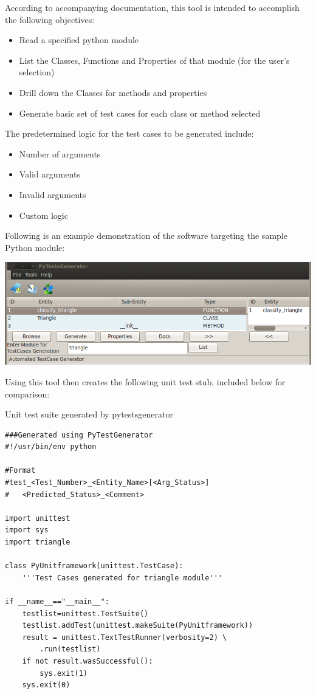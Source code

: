 \documentclass{icldt}
\numberwithin{equation}{section}       %
\begin{document}
{According to accompanying documentation, this tool is intended to accomplish the following objectives:
\begin{itemize}
	\item Read a specified python module
	\item List the Classes, Functions and Properties of that module (for the user's selection)
	\item Drill down the Classes for methods and properties
	\item Generate basic set of test cases for each class or method selected
\end{itemize}

The predetermined logic for the test cases to be generated include:
\begin{itemize}
	\item Number of arguments
	\item Valid arguments
	\item Invalid arguments
	\item Custom logic
\end{itemize}

Following is an example demonstration of the software targeting the sample Python module:

\includegraphics[scale=.51]{img/pytestsgenerator.png}

Using this tool then creates the following unit test stub, included below for comparison:
\begin{listing}[H]
	\caption{Unit test suite generated by \textsf{pytestsgenerator}}
	\begin{verbatim}
###Generated using PyTestGenerator
#!/usr/bin/env python

#Format
#test_<Test_Number>_<Entity_Name>[<Arg_Status>]
#	<Predicted_Status>_<Comment>

import unittest
import sys
import triangle

class PyUnitframework(unittest.TestCase):
	'''Test Cases generated for triangle module'''

if __name__=="__main__":
	testlist=unittest.TestSuite()
	testlist.addTest(unittest.makeSuite(PyUnitframework))
	result = unittest.TextTestRunner(verbosity=2) \
		.run(testlist)
	if not result.wasSuccessful():
		sys.exit(1)
	sys.exit(0)
	\end{verbatim}
	\label{lst:py-triangle-pytestsgenerator}
\end{listing}

}
\end{document}

